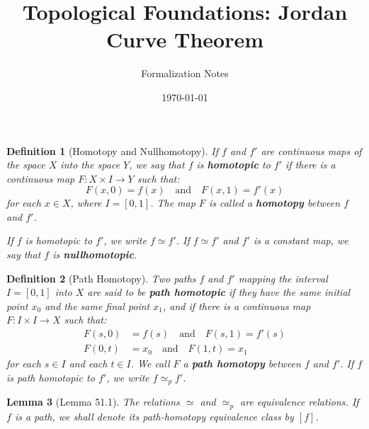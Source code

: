 \documentclass{article}
\newtheorem{definition}{Definition}
\newtheorem{lemma}[definition]{Lemma}
\begin{document}
\title{Topological Foundations: Jordan Curve Theorem}
\author{Formalization Notes}
\date{\today}
\maketitle

\begin{definition}[Homotopy and Nullhomotopy]
If $f$ and $f'$ are continuous maps of the space $X$ into the space $Y$, we say that $f$ is \textbf{homotopic} to $f'$ if there is a continuous map $F: X \times I \to Y$ such that:
\[
F(x, 0) = f(x) \quad \text{and} \quad F(x, 1) = f'(x)
\]
for each $x \in X$, where $I = [0, 1]$. The map $F$ is called a \textbf{homotopy} between $f$ and $f'$.

If $f$ is homotopic to $f'$, we write $f \simeq f'$. If $f \simeq f'$ and $f'$ is a constant map, we say that $f$ is \textbf{nullhomotopic}.
\end{definition}

\begin{definition}[Path Homotopy]
Two paths $f$ and $f'$ mapping the interval $I = [0, 1]$ into $X$ are said to be \textbf{path homotopic} if they have the same initial point $x_0$ and the same final point $x_1$, and if there is a continuous map $F: I \times I \to X$ such that:
\[
\begin{aligned}
F(s, 0) &= f(s) \quad \text{and} \quad F(s, 1) = f'(s) \\
F(0, t) &= x_0 \quad \text{and} \quad F(1, t) = x_1
\end{aligned}
\]
for each $s \in I$ and each $t \in I$. We call $F$ a \textbf{path homotopy} between $f$ and $f'$. If $f$ is path homotopic to $f'$, we write $f \simeq_p f'$.
\end{definition}

\begin{lemma}[Lemma 51.1]
The relations $\simeq$ and $\simeq_p$ are equivalence relations. If $f$ is a path, we shall denote its path-homotopy equivalence class by $[f]$.
\end{lemma}
\end{document}
